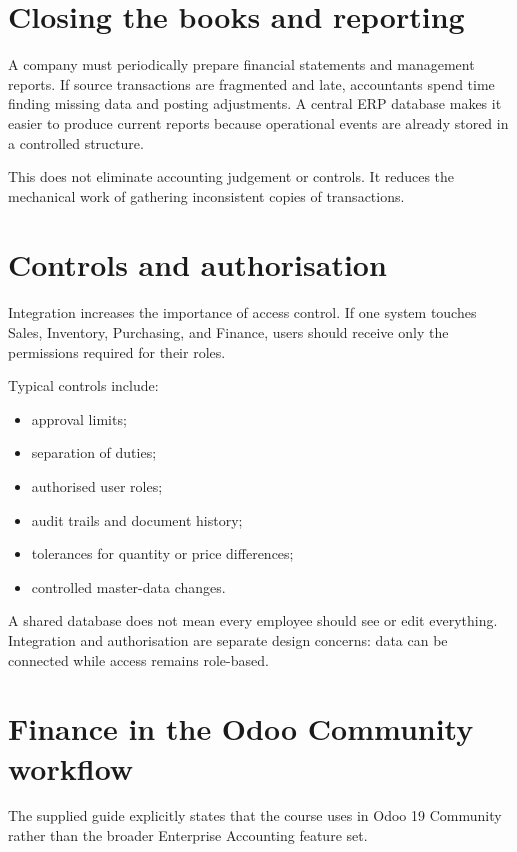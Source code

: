 \section{Closing the books and reporting}

A company must periodically prepare financial statements and management reports. If source transactions are fragmented and late, accountants spend time finding missing data and posting adjustments. A central ERP database makes it easier to produce current reports because operational events are already stored in a controlled structure.

This does not eliminate accounting judgement or controls. It reduces the mechanical work of gathering inconsistent copies of transactions.

\section{Controls and authorisation}

Integration increases the importance of access control. If one system touches Sales, Inventory, Purchasing, and Finance, users should receive only the permissions required for their roles.

Typical controls include:

\begin{itemize}
  \item approval limits;
  \item separation of duties;
  \item authorised user roles;
  \item audit trails and document history;
  \item tolerances for quantity or price differences;
  \item controlled master-data changes.
\end{itemize}

\begin{pitfall}
A shared database does not mean every employee should see or edit everything. Integration and authorisation are separate design concerns: data can be connected while access remains role-based.
\end{pitfall}

\section{Finance in the Odoo Community workflow}

The supplied guide explicitly states that the course uses  in Odoo 19 Community rather than the broader Enterprise Accounting feature set.

